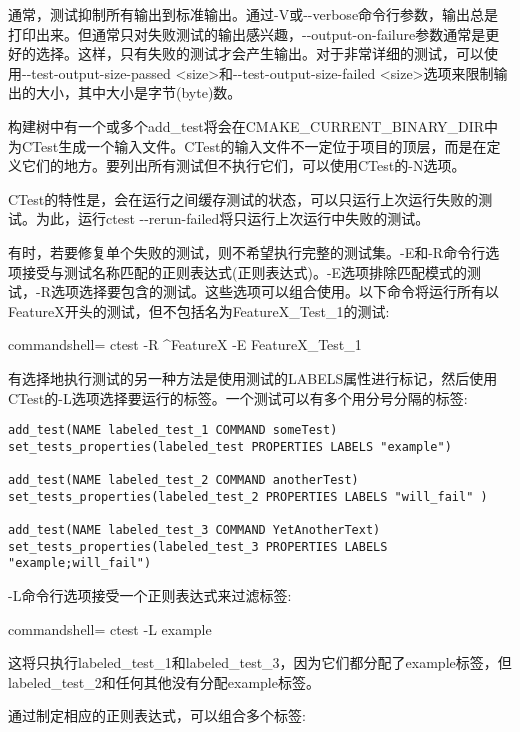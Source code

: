 通常，测试抑制所有输出到标准输出。通过-V或-{}-verbose命令行参数，输出总是打印出来。但通常只对失败测试的输出感兴趣，-{}-output-on-failure参数通常是更好的选择。这样，只有失败的测试才会产生输出。对于非常详细的测试，可以使用-{}-test-output-size-passed <size>和-{}-test-output-size-failed <size>选项来限制输出的大小，其中大小是字节(byte)数。

构建树中有一个或多个add\_test将会在CMAKE\_CURRENT\_BINARY\_DIR中为CTest生成一个输入文件。CTest的输入文件不一定位于项目的顶层，而是在定义它们的地方。要列出所有测试但不执行它们，可以使用CTest的-N选项。

CTest的特性是，会在运行之间缓存测试的状态，可以只运行上次运行失败的测试。为此，运行ctest -{}-rerun-failed将只运行上次运行中失败的测试。

有时，若要修复单个失败的测试，则不希望执行完整的测试集。-E和-R命令行选项接受与测试名称匹配的正则表达式(正则表达式)。-E选项排除匹配模式的测试，-R选项选择要包含的测试。这些选项可以组合使用。以下命令将运行所有以FeatureX开头的测试，但不包括名为FeatureX\_Test\_1的测试:

\begin{tcblisting}{commandshell={}}
ctest -R ^FeatureX -E FeatureX_Test_1
\end{tcblisting}

有选择地执行测试的另一种方法是使用测试的LABELS属性进行标记，然后使用CTest的-L选项选择要运行的标签。一个测试可以有多个用分号分隔的标签:

\begin{lstlisting}[style=styleCMake]
add_test(NAME labeled_test_1 COMMAND someTest)
set_tests_properties(labeled_test PROPERTIES LABELS "example")

add_test(NAME labeled_test_2 COMMAND anotherTest)
set_tests_properties(labeled_test_2 PROPERTIES LABELS "will_fail" )

add_test(NAME labeled_test_3 COMMAND YetAnotherText)
set_tests_properties(labeled_test_3 PROPERTIES LABELS "example;will_fail")
\end{lstlisting}

-L命令行选项接受一个正则表达式来过滤标签:

\begin{tcblisting}{commandshell={}}
ctest -L example
\end{tcblisting}

这将只执行labeled\_test\_1和labeled\_test\_3，因为它们都分配了example标签，但labeled\_test\_2和任何其他没有分配example标签。

通过制定相应的正则表达式，可以组合多个标签:

